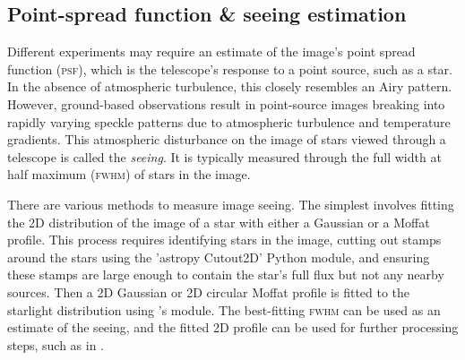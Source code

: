 \documentclass[a4paper, 11pt, fleqn]{memoir}
\begin{document}
\subsection{Point-spread function \& seeing estimation}
\label{ssec:psf-seeing-estimation}

Different experiments may require an estimate of the image's point spread function (\textsc{psf}), which is the telescope's response to a point source, such as a star.
In the absence of atmospheric turbulence, this closely resembles an Airy pattern. 
However, ground-based observations result in point-source images breaking into rapidly varying speckle patterns due to atmospheric turbulence and temperature gradients.
This atmospheric disturbance on the image of stars viewed through a telescope is called the \emph{seeing}.
It is typically measured through the full width at half maximum (\textsc{fwhm}) of stars in the image.

There are various methods to measure image seeing.
The simplest involves fitting the 2D distribution of the image of a star with either a Gaussian or a Moffat profile.
This process requires identifying stars in the image, cutting out stamps around the stars using the 'astropy Cutout2D' Python module, and ensuring these stamps are large enough to contain the star's full flux but not any nearby sources.
Then a 2D Gaussian or 2D circular Moffat profile is fitted to the starlight distribution using 's  module.
The best-fitting \textsc{fwhm} can be used as an estimate of the seeing, and the fitted 2D profile can be used for further processing steps, such as in .



\end{document}
